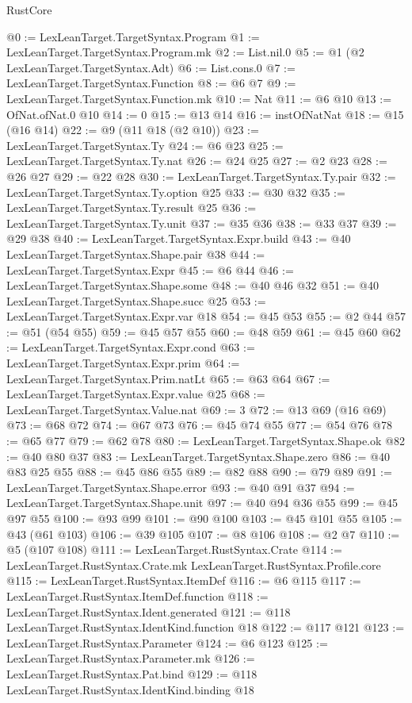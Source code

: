 \begin{lexlean}{RustCore}
\begin{coremodule}
@0 := LexLeanTarget.TargetSyntax.Program
@1 := LexLeanTarget.TargetSyntax.Program.mk
@2 := List.nil.{0}
@5 := @1 (@2 LexLeanTarget.TargetSyntax.Adt)
@6 := List.cons.{0}
@7 := LexLeanTarget.TargetSyntax.Function
@8 := @6 @7
@9 := LexLeanTarget.TargetSyntax.Function.mk
@10 := Nat
@11 := @6 @10
@13 := OfNat.ofNat.{0} @10
@14 := 0
@15 := @13 @14
@16 := instOfNatNat
@18 := @15 (@16 @14)
@22 := @9 (@11 @18 (@2 @10))
@23 := LexLeanTarget.TargetSyntax.Ty
@24 := @6 @23
@25 := LexLeanTarget.TargetSyntax.Ty.nat
@26 := @24 @25
@27 := @2 @23
@28 := @26 @27
@29 := @22 @28
@30 := LexLeanTarget.TargetSyntax.Ty.pair
@32 := LexLeanTarget.TargetSyntax.Ty.option @25
@33 := @30 @32
@35 := LexLeanTarget.TargetSyntax.Ty.result @25
@36 := LexLeanTarget.TargetSyntax.Ty.unit
@37 := @35 @36
@38 := @33 @37
@39 := @29 @38
@40 := LexLeanTarget.TargetSyntax.Expr.build
@43 := @40 LexLeanTarget.TargetSyntax.Shape.pair @38
@44 := LexLeanTarget.TargetSyntax.Expr
@45 := @6 @44
@46 := LexLeanTarget.TargetSyntax.Shape.some
@48 := @40 @46 @32
@51 := @40 LexLeanTarget.TargetSyntax.Shape.succ @25
@53 := LexLeanTarget.TargetSyntax.Expr.var @18
@54 := @45 @53
@55 := @2 @44
@57 := @51 (@54 @55)
@59 := @45 @57 @55
@60 := @48 @59
@61 := @45 @60
@62 := LexLeanTarget.TargetSyntax.Expr.cond
@63 := LexLeanTarget.TargetSyntax.Expr.prim
@64 := LexLeanTarget.TargetSyntax.Prim.natLt
@65 := @63 @64
@67 := LexLeanTarget.TargetSyntax.Expr.value @25
@68 := LexLeanTarget.TargetSyntax.Value.nat
@69 := 3
@72 := @13 @69 (@16 @69)
@73 := @68 @72
@74 := @67 @73
@76 := @45 @74 @55
@77 := @54 @76
@78 := @65 @77
@79 := @62 @78
@80 := LexLeanTarget.TargetSyntax.Shape.ok
@82 := @40 @80 @37
@83 := LexLeanTarget.TargetSyntax.Shape.zero
@86 := @40 @83 @25 @55
@88 := @45 @86 @55
@89 := @82 @88
@90 := @79 @89
@91 := LexLeanTarget.TargetSyntax.Shape.error
@93 := @40 @91 @37
@94 := LexLeanTarget.TargetSyntax.Shape.unit
@97 := @40 @94 @36 @55
@99 := @45 @97 @55
@100 := @93 @99
@101 := @90 @100
@103 := @45 @101 @55
@105 := @43 (@61 @103)
@106 := @39 @105
@107 := @8 @106
@108 := @2 @7
@110 := @5 (@107 @108)
@111 := LexLeanTarget.RustSyntax.Crate
@114 := LexLeanTarget.RustSyntax.Crate.mk LexLeanTarget.RustSyntax.Profile.core
@115 := LexLeanTarget.RustSyntax.ItemDef
@116 := @6 @115
@117 := LexLeanTarget.RustSyntax.ItemDef.function
@118 := LexLeanTarget.RustSyntax.Ident.generated
@121 := @118 LexLeanTarget.RustSyntax.IdentKind.function @18
@122 := @117 @121
@123 := LexLeanTarget.RustSyntax.Parameter
@124 := @6 @123
@125 := LexLeanTarget.RustSyntax.Parameter.mk
@126 := LexLeanTarget.RustSyntax.Pat.bind
@129 := @118 LexLeanTarget.RustSyntax.IdentKind.binding @18

\end{coremodule}
\end{lexlean}
